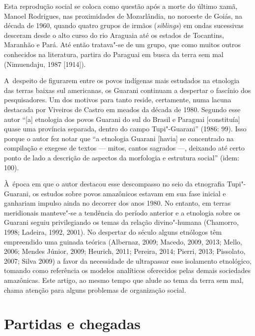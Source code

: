 Esta reprodução social se coloca como questão após a morte do último
xamã, Manoel Rodrigues, nas proximidades de Mozarlândia, no noroeste de
Goiás, na década de 1960, quando quatro grupos de irmãos (\emph{siblings}) em
ondas sucessivas desceram desde o alto curso do rio Araguaia até os
estados de Tocantins, Maranhão e Pará. Até então tratava"-se de um
grupo, que como muitos outros conhecidos na literatura, partira do
Paraguai em busca da terra sem mal (Nimuendaju, 1987 [1914]).

A~despeito de figurarem entre os povos indígenas mais estudados na
etnologia das terras baixas sul americanas, os Guarani continuam a
despertar o fascínio dos pesquisadores. Um dos motivos para tanto
reside, certamente, numa lacuna destacada por Viveiros de Castro em
meados da década de 1980. Segundo esse autor ``[a] etnologia dos povos
Guarani do sul do Brasil e Paraguai [constituía] quase uma província
separada, dentro do campo Tupi"-Guarani'' (1986: 99). Isso porque o autor
fez notar que ``a etnologia Guarani [havia] se concentrado na compilação
e exegese de textos --- mitos, cantos sagrados ---, deixando até certo
ponto de lado a descrição de aspectos da morfologia e estrutura social''
(idem: 100).

À~época em que o autor destacou esse descompasso no seio da etnografia
Tupi"-Guarani, os estudos sobre povos amazônicos estavam em sua fase
inicial e ganhariam impulso ainda no decorrer dos anos 1980. No
entanto, em terras meridionais manteve"-se a tendência do período
anterior e a etnologia sobre os Guarani seguiu privilegiando os temas
da relação divino"-humana (Chamorro, 1998; Ladeira, 1992, 2001). No
despertar do século  alguns etnólogos têm empreendido uma guinada
teórica (Albernaz, 2009; Macedo, 2009, 2013; Mello, 2006; Mendes
Júnior, 2009; Heurich, 2011; Pereira, 2014; Pierri, 2013; Pissolato,
2007; Silva 2009) a favor da necessidade de ultrapassar esse isolamento
etnológico, tomando como referência os modelos analíticos oferecidos
pelas demais sociedades amazônicas. Este artigo, ao mesmo tempo que
alude ao tema da terra sem mal, chama atenção para alguns problemas de
organização social. 

\section{Partidas e chegadas}

